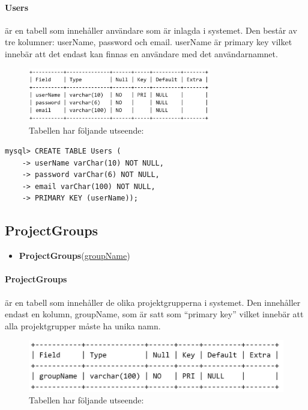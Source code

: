 \documentclass[paper=a4, fontsize=11pt,twoside]{article}
\begin{document}
\paragraph{Users} är en tabell som innehåller användare som är inlagda i systemet. Den består av tre kolumner: userName, password och email. userName är primary key vilket innebär att det endast kan finnas en användare med det användarnamnet.

\begin{figure}[H]
\centering
\caption{Tabellen har följande utseende:}
\includegraphics[width=8cm]{UsersTable}
\end{figure}

\begin{lstlisting}[frame=single, caption={Tabellen kan konstrueras med följande SQL-satser:}]
mysql> CREATE TABLE Users (
    -> userName varChar(10) NOT NULL,
    -> password varChar(6) NOT NULL,
    -> email varChar(100) NOT NULL,
    -> PRIMARY KEY (userName));
\end{lstlisting}

\subsection{ProjectGroups}
\begin{itemize}
\item[] \textbf{ProjectGroups}(\underline{groupName})
\end{itemize}
\paragraph{ProjectGroups} är en tabell som innehåller de olika projektgrupperna i systemet. Den innehåller endast en kolumn, groupName, som är satt som ``primary key'' vilket innebär att alla projektgrupper måste ha unika namn.

\begin{figure}[H]
\centering
\caption{Tabellen har följande utseende:}
\includegraphics{ProjectGroupsTable}
\end{figure}
\end{document}
